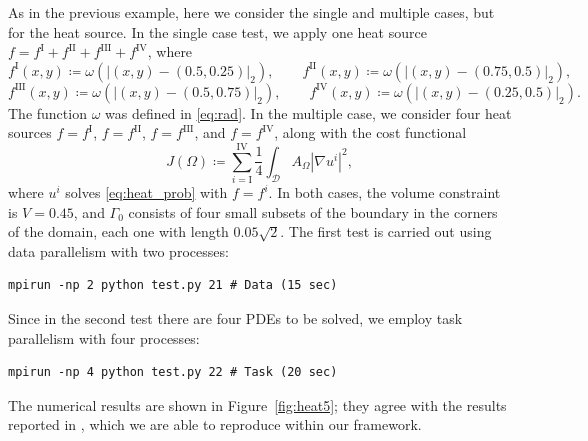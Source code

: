 \documentclass[preprint,9pt]{elsarticle}
\begin{document}
\begin{example}\label{ex:heat5}
As in the previous example, here we consider the single and multiple cases,
but for the heat source.
In the single case test, we apply one heat source 
$f = f^\mathrm{I} + f^\mathrm{II} + f^\mathrm{III} + f^\mathrm{IV}$,
where
$$
	f^\mathrm{I}(x,y) \coloneqq \omega(\vert(x,y)-(0.5, 0.25)\vert_2),\qquad
	f^\mathrm{II}(x,y) \coloneqq \omega(\vert(x,y)-(0.75, 0.5)\vert_2),
$$
$$
	f^\mathrm{III}(x,y) \coloneqq \omega(\vert(x,y)-(0.5, 0.75)\vert_2),\qquad
	f^\mathrm{IV}(x,y) \coloneqq \omega(\vert(x,y)-(0.25, 0.5)\vert_2).
$$
The function $\omega$ was defined in \eqref{eq:rad}.
In the multiple case, we consider four heat sources 
$f=f^\mathrm{I}$, $f=f^\mathrm{II}$, $f=f^\mathrm{III}$, and $f=f^\mathrm{IV}$,
along with the cost functional
\[
	J(\Omega) \coloneqq \sum_{i=\mathrm{I}}^{\mathrm{IV}}\frac{1}{4}
	\int_{\mathcal{D}} A_{\Omega}\left|\nabla u^i\right|^{2},
\]
where $u^i$ solves \eqref{eq:heat_prob} with $f = f^i$.
In both cases, the volume constraint is $V = 0.45$, and 
$\Gamma_0$ consists of four small subsets
of the boundary in the corners of the domain, each one with length $0.05\sqrt{2}$.
The first test is carried out using data parallelism with two processes:
\begin{lstlisting}
mpirun -np 2 python test.py 21 # Data (15 sec)
\end{lstlisting}
Since in the second test there are four PDEs to be solved,
we employ task parallelism with four processes:
\begin{lstlisting}
mpirun -np 4 python test.py 22 # Task (20 sec)
\end{lstlisting}
The numerical results are shown in Figure~\ref{fig:heat5};
they agree with the results reported in \cite{MR2278190},
which we are able to reproduce within our framework.
\end{example}
\end{document}

